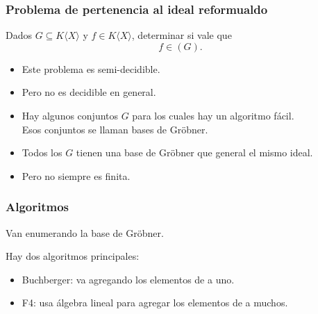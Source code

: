 \documentclass[spanish, aspectratio=169, hidecontrols]{beamer}
\begin{document}
\begin{frame}
  \frametitle{Problema de pertenencia al ideal reformualdo}
  Dados $G ⊆ K⟨X⟩$ y $f ∈ K⟨X⟩$, determinar si vale que
  \[ f ∈ (G) \text{.}\]
  \pause
  \begin{itemize}
    \item Este problema es semi-decidible.
    \pause
    \item Pero no es decidible en general.
    \pause
    \item Hay algunos conjuntos $G$ para los cuales hay un algoritmo fácil. \pause \\
    Esos conjuntos se llaman bases de Gröbner.
    \pause
    \item Todos los $G$ tienen una base de Gröbner que general el mismo ideal.
    \pause
    \item Pero no siempre es finita.
  \end{itemize}
\end{frame}




\begin{frame}
  \frametitle{Algoritmos}
  \pause

  Van enumerando la base de Gröbner.

  \pause
  Hay dos algoritmos principales:
  \pause
  \begin{itemize}
    \item Buchberger: \pause va agregando los elementos de a uno.
    \item F4: \pause usa álgebra lineal para agregar los elementos de a muchos.
  \end{itemize}
\end{frame}
\end{document}
